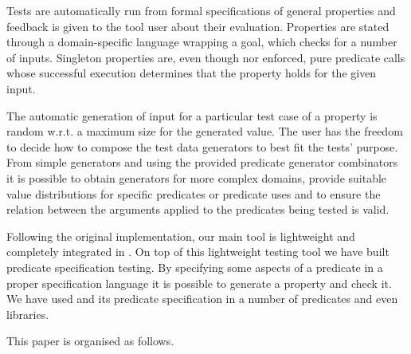 Tests are automatically run from formal specifications of general
properties and feedback is given to the tool user about their
evaluation.
%
Properties are stated through a domain-specific language wrapping a
\Prolog{} goal, which \plqc{} checks for a number of inputs.
%
Singleton properties are, even though nor enforced, pure predicate calls
whose successful execution determines that the property holds for the
given input.


The automatic generation of input for a particular test case of a
property is random w.r.t. a maximum size for the generated value.
%
The user has the freedom to decide how to compose the test data
generators to best fit the tests' purpose.
%
From simple generators and using the provided predicate generator
combinators it is possible to obtain generators for more complex
domains, provide suitable value distributions for specific predicates or
predicate uses and to ensure the relation between the arguments applied
to the predicates being tested is valid.


Following the original \QuickCheck{} implementation, our main tool is
lightweight and completely integrated in \Prolog{}.
%
On top of this lightweight testing tool we have built predicate
specification testing.
%
By specifying some aspects of a predicate in a proper specification
language it is possible to generate a \plqc{} property and check it.
%
We have used \plqc{} and its predicate specification in a number of
predicates and even libraries.



This paper is organised as follows.
%


